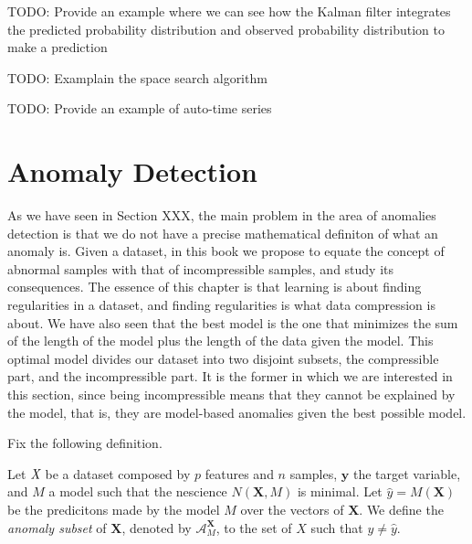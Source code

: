 \begin{example}
{\color{red} TODO: Provide an example where we can see how the Kalman filter integrates the predicted probability distribution and observed probability distribution to make a prediction}
\end{example}

{\color{red} TODO: Examplain the space search algorithm}

\begin{example}
{\color{red} TODO: Provide an example of auto-time series}
\end{example}

%
%

\section{Anomaly Detection}

As we have seen in Section XXX, the main problem in the area of anomalies detection is that we do not have a precise mathematical definiton of what an anomaly is. Given a dataset, in this book we propose to equate the concept of abnormal samples with that of incompressible samples, and study its consequences. The essence of this chapter is that learning is about finding regularities in a dataset, and finding regularities is what data compression is about. We have also seen that the best model is the one that minimizes the sum of the length of the model plus the length of the data given the model. This optimal model divides our dataset into two disjoint subsets, the compressible part, and the incompressible part. It is the former in which we are interested in this section, since being incompressible means that they cannot be explained by the model, that is, they are model-based anomalies given the best possible model.

{\color{red} Fix the following definition.}

\begin{definition}
Let $\emph{X}$ be a dataset composed by $p$ features and $n$ samples, $\mathbf{y}$ the target variable, and $\mathit{M}$ a model such that the nescience $N \left( \mathbf{X}, \mathit{M} \right)$ is minimal. Let $\hat{y} = \mathit{M} \left( \mathbf{X} \right)$ be the predicitons made by the model $\mathit{M}$ over the vectors of $\mathbf{X}$. We define the \emph{anomaly subset} of $\mathbf{X}$, denoted by $\mathcal{A}_\mathit{M}^\mathbf{X}$, to the set of $X$ such that $y \neq \hat{y}$.
\end{definition}


